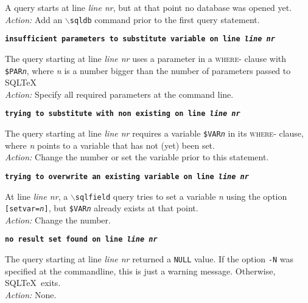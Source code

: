 \documentclass{article}
\newcommand{\bs}{\ensuremath{\backslash}}
\newcommand{\vs}{\vspace{3mm}}
\begin{document}
\vspace{1mm}

\noindent A query starts at line \textit{line nr}, but at that point no database was opened yet. \\
\textit{Action:} Add an \texttt{\bs sqldb} command prior to the first query statement.

\vs

\noindent\textbf{\texttt{insufficient parameters to substitute variable on line \textit{line nr}}}

\vspace{1mm}

\noindent The query starting at line \textit{line nr} uses a parameter in a \textsc{where}- clause with
\texttt{\$PAR\textit{n}}, where \textit{n} is a number bigger than the number of parameters
passed to SQL\TeX\. \\
\textit{Action:} Specify all required parameters at the command line.

\vs

\noindent\textbf{\texttt{trying to substitute with non existing on line \textit{line nr}}}

\vspace{1mm}

\noindent The query starting at line \textit{line nr} requires a variable \texttt{\$VAR\textit{n}} in its
\textsc{where}- clause, where \textit{n} points to a variable that has not (yet) been set. \\
\textit{Action:} Change the number or set the variable prior to this statement.

\vs

\noindent\textbf{\texttt{trying to overwrite an existing variable on line \textit{line nr}}}

\vspace{1mm}

\noindent At line \textit{line nr}, a \texttt{\bs sqlfield} query tries to set a variable \textit{n}
using the option \texttt{[setvar=\textit{n}]}, but \texttt{\$VAR\textit{n}} already
exists at that point. \\
\textit{Action:} Change the number.

\vs

\noindent\textbf{\texttt{no result set found on line \textit{line nr}}}

\vspace{1mm}

\noindent The query starting at line \textit{line nr} returned a \texttt{NULL} value. If the
option \texttt{-N} was specified at the commandline, this is just a warning message.
Otherwise, SQL\TeX\ exits. \\
\textit{Action:} None.
\end{document}
